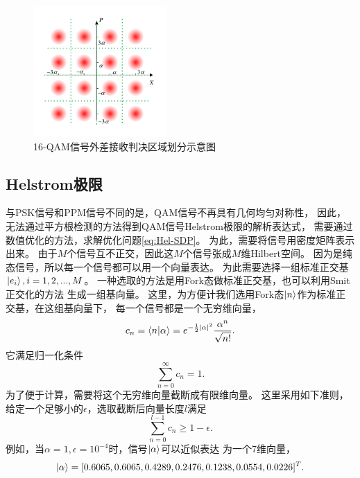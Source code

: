 \begin{figure}
\centering
  \includegraphics[height=5cm]{figures/chap3/QAM-domain-split}
  \caption{16-QAM信号外差接收判决区域划分示意图}
  \label{fig:QAM-domain-split}
\end{figure}

\subsection{Helstrom极限}
与PSK信号和PPM信号不同的是，QAM信号不再具有几何均匀对称性，
因此，无法通过平方根检测的方法得到QAM信号Helstrom极限的解析表达式，
需要通过数值优化的方法，求解优化问题\ref{eq:Hel-SDP}。
为此，需要将信号用密度矩阵表示出来。
由于$M$个信号互不正交，因此这$M$个信号张成$M$维Hilbert空间。
因为是纯态信号，所以每一个信号都可以用一个向量表达。
为此需要选择一组标准正交基$\ket{e_i}, i=1,2,...,M$。
一种选取的方法是用Fork态做标准正交基，也可以利用Smit正交化的方法
生成一组基向量\cite{zxd2004matrix}。
这里，为方便计我们选用Fork态$\ket{n}$作为标准正交基，在这组基向量下，
每一个信号都是一个无穷维向量，
\begin{equation}
c_n = \bra{n}\ket{\alpha} = e^{-\frac{1}{2}|\alpha|^2} \frac{\alpha^n}{\sqrt{n!}}.
\end{equation}
它满足归一化条件
\begin{equation}
\sum_{n=0}^{\infty} c_n = 1.
\end{equation}
为了便于计算，需要将这个无穷维向量截断成有限维向量。
这里采用如下准则，给定一个足够小的$\epsilon$，选取截断后向量长度$l$满足
\begin{equation}
\sum_{n=0}^{l-1} c_n \ge 1 - \epsilon.
\label{eq:epsilon-criterion}
\end{equation}
例如，当$\alpha=1, \epsilon=10^{-4}$时，信号$\ket{\alpha}$可以近似表达
为一个7维向量，
\begin{equation}
\ket{\alpha} = [0.6065, \\
    0.6065, \\
    0.4289, \\
    0.2476, \\
    0.1238, \\
    0.0554, \\
    0.0226]^T.
\end{equation}
